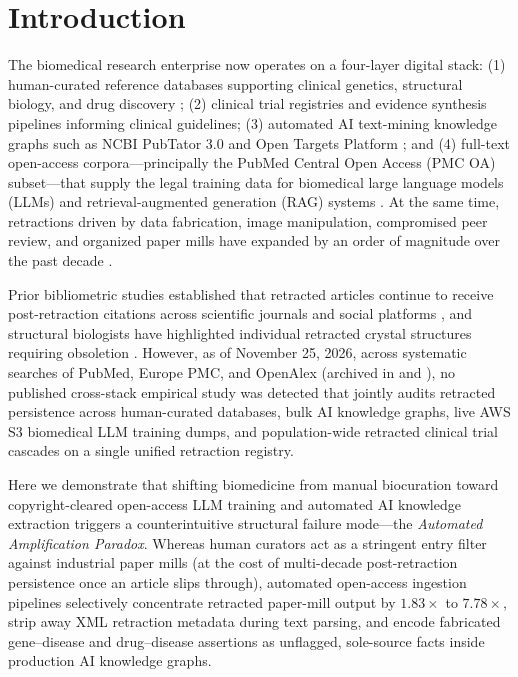 \documentclass[11pt,letterpaper]{article}
\begin{document}
\section{Introduction}
The biomedical research enterprise now operates on a four-layer digital stack: (1) human-curated reference databases supporting clinical genetics, structural biology, and drug discovery \citep{landrum2025_clinvar,berman2000_pdb,zdrazil2024_chembl,uniprot2025,go2023,deltoro2022_intact,sollis2023_gwas,griffith2017_civic}; (2) clinical trial registries and evidence synthesis pipelines informing clinical guidelines; (3) automated AI text-mining knowledge graphs such as NCBI PubTator 3.0 and Open Targets Platform \citep{wei2024_pubtator3,ochoa2023_opentargets_main,ochoa2023_opentargets}; and (4) full-text open-access corpora—principally the PubMed Central Open Access (PMC OA) subset—that supply the legal training data for biomedical large language models (LLMs) and retrieval-augmented generation (RAG) systems \citep{wu2024_pmcllama}. At the same time, retractions driven by data fabrication, image manipulation, compromised peer review, and organized paper mills have expanded by an order of magnitude over the past decade \citep{fang2012,steen2013,moylan2016,brainard2018_science,richardson2025_papermills,aibar2025_papermill,jclinepi2026}.

Prior bibliometric studies established that retracted articles continue to receive post-retraction citations across scientific journals and social platforms \citep{barilan2017,schneider2020,peng2022}, and structural biologists have highlighted individual retracted crystal structures requiring obsoletion \citep{wlodawer2018}. However, as of November 25, 2026, across systematic searches of PubMed, Europe PMC, and OpenAlex (archived in  and ), no published cross-stack empirical study was detected that jointly audits retracted persistence across human-curated databases, bulk AI knowledge graphs, live AWS S3 biomedical LLM training dumps, and population-wide retracted clinical trial cascades on a single unified retraction registry.

Here we demonstrate that shifting biomedicine from manual biocuration toward copyright-cleared open-access LLM training and automated AI knowledge extraction triggers a counterintuitive structural failure mode—the \emph{Automated Amplification Paradox}. Whereas human curators act as a stringent entry filter against industrial paper mills (at the cost of multi-decade post-retraction persistence once an article slips through), automated open-access ingestion pipelines selectively concentrate retracted paper-mill output by $1.83\times$ to $7.78\times$, strip away XML retraction metadata during text parsing, and encode fabricated gene--disease and drug--disease assertions as unflagged, sole-source facts inside production AI knowledge graphs.
\end{document}
